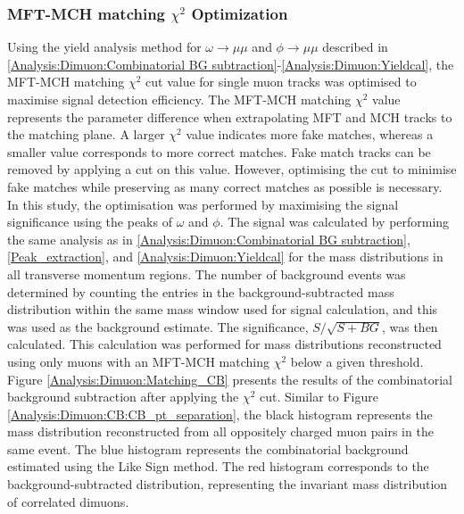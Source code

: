         \subsubsection{MFT-MCH matching $\chi^2$ Optimization}
        \label{matching_chi2_opt}
            Using the yield analysis method for $\omega \rightarrow \mu\mu$ and $\phi \rightarrow \mu\mu$ described in \ref{Analysis:Dimuon:Combinatorial BG subtraction}-\ref{Analysis:Dimuon:Yieldcal}, the MFT-MCH matching \(\chi^2\) cut value for single muon tracks was optimised to maximise signal detection efficiency. The MFT-MCH matching \(\chi^2\) value represents the parameter difference when extrapolating MFT and MCH tracks to the matching plane. A larger \(\chi^2\) value indicates more fake matches, whereas a smaller value corresponds to more correct matches. Fake match tracks can be removed by applying a cut on this value. However, optimising the cut to minimise fake matches while preserving as many correct matches as possible is necessary. In this study, the optimisation was performed by maximising the signal significance using the peaks of \(\omega\) and \(\phi\).
            The signal was calculated by performing the same analysis as in \ref{Analysis:Dimuon:Combinatorial BG subtraction}, \ref{Peak_extraction}, and \ref{Analysis:Dimuon:Yieldcal} for the mass distributions in all transverse momentum regions. The number of background events was determined by counting the entries in the background-subtracted mass distribution within the same mass window used for signal calculation, and this was used as the background estimate. The significance, \( S/\sqrt{S+BG} \), was then calculated. This calculation was performed for mass distributions reconstructed using only muons with an MFT-MCH matching \(\chi^2\) below a given threshold.  
            Figure \ref{Analysis:Dimuon:Matching_CB} presents the results of the combinatorial background subtraction after applying the \(\chi^2\) cut. Similar to Figure \ref{Analysis:Dimuon:CB:CB_pt_separation}, the black histogram represents the mass distribution reconstructed from all oppositely charged muon pairs in the same event. The blue histogram represents the combinatorial background estimated using the Like Sign method. The red histogram corresponds to the background-subtracted distribution, representing the invariant mass distribution of correlated dimuons.

